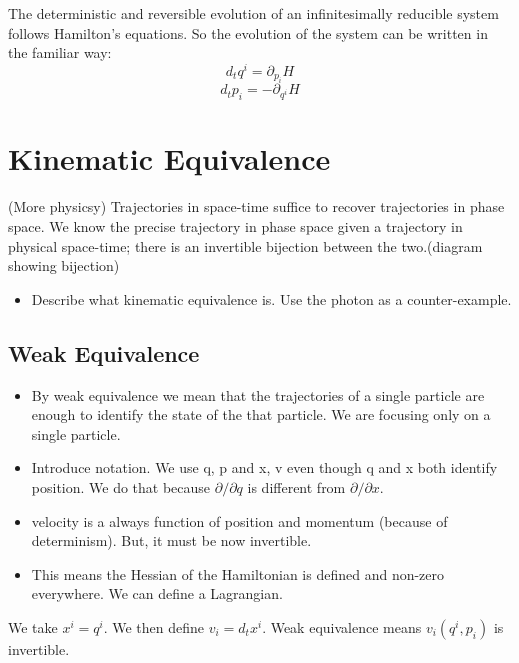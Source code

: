 \documentclass{article}
\begin{document}
\begin{prop}
	The deterministic and reversible evolution of an infinitesimally reducible system follows Hamilton's equations. So the evolution of the system can be written in the familiar way:
	$$d_tq^i = \partial_{p_i}H$$
	$$d_tp_i = -\partial_{q^i}H$$
\end{prop} 

\section{Kinematic Equivalence}

\begin{assump}
	(More physicsy) Trajectories in space-time suffice to recover trajectories in phase space. We know the precise trajectory in phase space given a trajectory in physical space-time; there is an invertible bijection between the two.(diagram showing bijection)
\end{assump}

\begin{itemize}
	\item Describe what kinematic equivalence is. Use the photon as a counter-example.
\end{itemize}

\subsection{Weak Equivalence}

\begin{itemize}
	\item By weak equivalence we mean that the trajectories of a single particle are enough to identify the state of the that particle. We are focusing only on a single particle.
	
	\item Introduce notation. We use q, p and x, v even though q and x both identify position. We do that because $\partial/\partial q$ is different from $\partial / \partial x$.
	
	\item velocity is a always function of position and momentum (because of determinism). But, it must be now invertible.
	
	\item This means the Hessian of the Hamiltonian is defined and non-zero everywhere. We can define a Lagrangian.
\end{itemize}

\begin{defn}
	We take $x^i = q^i$. We then define $v_i = d_tx^i$. Weak equivalence means $v_i(q^i, p_i)$ is invertible.
\end{defn}
\end{document}
